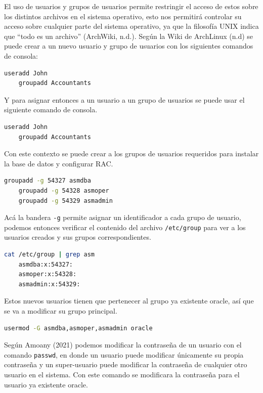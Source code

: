 \documentclass{article}
\begin{document}
El uso de usuarios y grupos de usuarios permite restringir el acceso de estos sobre los distintos archivos en el sistema operativo, esto nos permitirá controlar su acceso sobre cualquier parte del sistema operativo, ya que la filosofía UNIX indica que ``todo es un archivo'' (ArchWiki, n.d.). Según la Wiki de ArchLinux (n.d) se puede crear a un nuevo usuario y grupo de usuarios con los siguientes comandos de consola:

\begin{lstlisting}[style=mystyle,language=bash]
	useradd John
	groupadd Accountants
\end{lstlisting}

Y para asignar entonces a un usuario a un grupo de usuarios se puede usar el siguiente comando de consola.

\begin{lstlisting}[style=mystyle,language=bash]
	useradd John
	groupadd Accountants
\end{lstlisting}

Con este contexto se puede crear a los grupos de usuarios requeridos para instalar la base de datos y configurar RAC.

\begin{lstlisting}[style=mystyle,language=bash]
	groupadd -g 54327 asmdba
	groupadd -g 54328 asmoper
	groupadd -g 54329 asmadmin
\end{lstlisting}

Acá la bandera \texttt{-g} permite asignar un identificador a cada grupo de usuario, podemos entonces verificar el contenido del archivo \texttt{/etc/group} para ver a los usuarios creados y sus grupos correspondientes.

\begin{lstlisting}[style=mystyle,language=bash]
	cat /etc/group | grep asm
	asmdba:x:54327:
	asmoper:x:54328:
	asmadmin:x:54329:
\end{lstlisting}

Estos nuevos usuarios tienen que pertenecer al grupo ya existente oracle, así que se va a modificar su grupo principal.

\begin{lstlisting}[style=mystyle,language=bash]
	usermod -G asmdba,asmoper,asmadmin oracle
\end{lstlisting}

Según Amoany (2021) podemos modificar la contraseña de un usuario con el comando \texttt{passwd}, en donde un usuario puede modificar únicamente su propia contraseña y un super-usuario puede modificar la contraseña de cualquier otro usuario en el sistema. Con este comando se modificara la contraseña para el usuario ya existente oracle.
\end{document}
